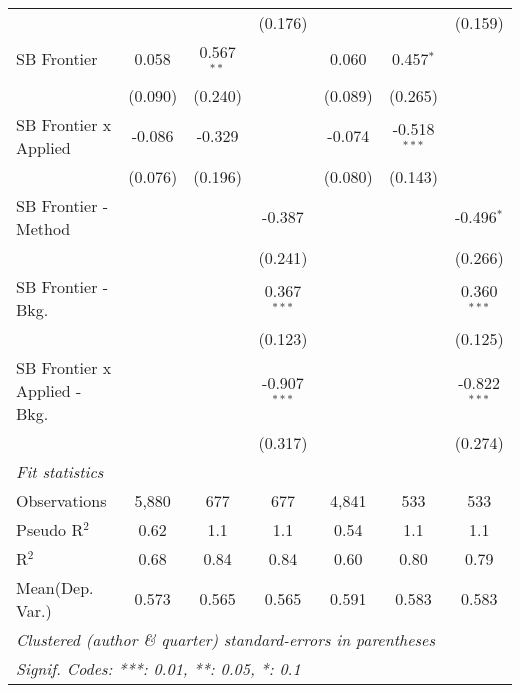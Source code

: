 \begin{tabular}{lcccccc}
                                  &         &              & (0.176)        &         &                & (0.159)\\   
   SB Frontier                    & 0.058   & 0.567$^{**}$ &                & 0.060   & 0.457$^{*}$    &   \\   
                                  & (0.090) & (0.240)      &                & (0.089) & (0.265)        &   \\   
   SB Frontier x Applied          & -0.086  & -0.329       &                & -0.074  & -0.518$^{***}$ &   \\   
                                  & (0.076) & (0.196)      &                & (0.080) & (0.143)        &   \\   
   SB Frontier - Method           &         &              & -0.387         &         &                & -0.496$^{*}$\\   
                                  &         &              & (0.241)        &         &                & (0.266)\\   
   SB Frontier - Bkg.             &         &              & 0.367$^{***}$  &         &                & 0.360$^{***}$\\   
                                  &         &              & (0.123)        &         &                & (0.125)\\   
   SB Frontier x Applied - Bkg.   &         &              & -0.907$^{***}$ &         &                & -0.822$^{***}$\\   
                                  &         &              & (0.317)        &         &                & (0.274)\\   
   \midrule
   \emph{Fit statistics}\\
   Observations                   & 5,880   & 677          & 677            & 4,841   & 533            & 533\\  
   Pseudo R$^2$                   & 0.62    & 1.1          & 1.1            & 0.54    & 1.1            & 1.1\\  
   R$^2$                          & 0.68    & 0.84         & 0.84           & 0.60    & 0.80           & 0.79\\  
Mean(Dep. Var.) & 0.573 & 0.565 & 0.565 & 0.591 & 0.583 & 0.583 \\
   \midrule \midrule
   \multicolumn{7}{l}{\emph{Clustered (author \& quarter) standard-errors in parentheses}}\\
   \multicolumn{7}{l}{\emph{Signif. Codes: ***: 0.01, **: 0.05, *: 0.1}}\\
\end{tabular}
\par\endgroup
